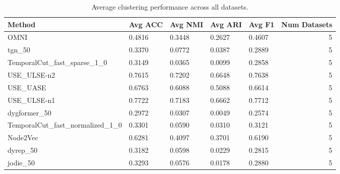 \begin{table}
\caption{Average clustering performance across all datasets.}
\label{tab:clustering_summary}
\begin{tabular}{lllllr}
\toprule
Method & Avg ACC & Avg NMI & Avg ARI & Avg F1 & Num Datasets \\
\midrule
OMNI & 0.4816 & 0.3448 & 0.2627 & 0.4607 & 5 \\
tgn_50 & 0.3370 & 0.0772 & 0.0387 & 0.2889 & 5 \\
TemporalCut_fast_sparse_1_0 & 0.3149 & 0.0365 & 0.0099 & 0.2858 & 5 \\
USE_ULSE-n2 & 0.7615 & 0.7202 & 0.6648 & 0.7638 & 5 \\
USE_UASE & 0.6763 & 0.6088 & 0.5088 & 0.6614 & 5 \\
USE_ULSE-n1 & 0.7722 & 0.7183 & 0.6662 & 0.7712 & 5 \\
dygformer_50 & 0.2972 & 0.0307 & 0.0049 & 0.2574 & 5 \\
TemporalCut_fast_normalized_1_0 & 0.3301 & 0.0590 & 0.0310 & 0.3121 & 5 \\
Node2Vec & 0.6281 & 0.4097 & 0.3701 & 0.6190 & 5 \\
dyrep_50 & 0.3182 & 0.0598 & 0.0229 & 0.2815 & 5 \\
jodie_50 & 0.3293 & 0.0576 & 0.0178 & 0.2880 & 5 \\
\bottomrule
\end{tabular}
\end{table}
